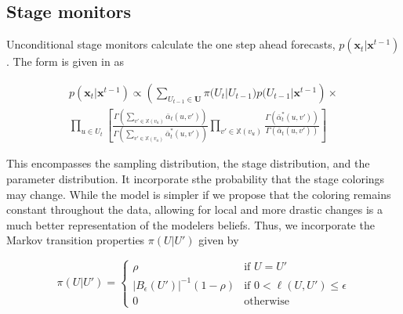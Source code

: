 \documentclass[12pt]{article}
\begin{document}
 

\subsection{Stage monitors}
 
 Unconditional stage monitors calculate the one step ahead forecasts, $p(\bm{x}_t  | \bm{x}^{t-1})$. The form is given in \cite{Freeman} as 
 
 

%

\begin{multline}
  p(\bm{x}_t | \bm{x}^{t-1}) \propto \left( \sum_{U_{t-1} \in \bm{U}} \pi(U_t | U_{t-1}) p(U_{t-1} | \bm{x}^{t-1} \right) \times 
\\ \prod_{u \in U_t} \left[ \frac{\Gamma\left( \sum_{v' \in \mathbb{X}(v_u)} \bar{\alpha}_t (u,v') \right)}{\Gamma\left( \sum_{v' \in \mathbb{X}(v_u)} \bar{\alpha}_t^* (u,v') \right)} \prod_{v' \in \mathbb{X}(v_u)} \frac{\Gamma(\bar{\alpha}_t^* (u,v'))}{\Gamma(\bar{\alpha}_t (u,v'))}   \right]
\end{multline}

This encompasses the sampling distribution, the stage distribution, and the parameter distribution. It incorporate sthe probability that the stage colorings may change. While the model is simpler if we propose that the coloring remains constant throughout the data, allowing for local and more drastic changes is a much better representation of the modelers beliefs. Thus, we incorporate the Markov transition properties $\pi (U | U')$ given by 

\begin{equation}
\pi(U | U')=
\begin{cases} 
      \rho & \text{if } U = U' \\
      |B_\epsilon(U')|^{-1}(1-\rho) & \text{if }  0 < \ell(U,U') \leq \epsilon\\
      0 & \text{otherwise}
   \end{cases}
\end{equation}
\end{document}
